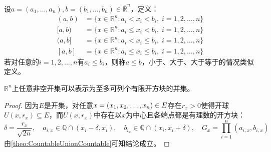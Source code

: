 \begin{definition}
	设$a=(a_1,\dots,a_n),b=(b_1,\dots,b_n)\in\overline{\mathbb{R}}^n$，定义：
	\begin{align*}
		(a,b)&=\{x\in\mathbb{R}^{n}:a_i<x_i<b_i,\;i=1,2,\dots,n\} \\
		[a,b)&=\{x\in\mathbb{R}^{n}:a_i\leqslant x_i<b_i,\;i=1,2,\dots,n\} \\
		(a,b]&=\{x\in\mathbb{R}^{n}:a_i<x_i\leqslant b_i,\;i=1,2,\dots,n\} \\
		[a,b]&=\{x\in\mathbb{R}^{n}:a_i\leqslant x_i\leqslant b_i,\;i=1,2,\dots,n\}
	\end{align*}
	若对任意的$i=1,2,\dots,n$有$a_i\leqslant b_i$，则称$a\leqslant b$，小于、大于、大于等于的情况类似定义。
\end{definition}
\begin{lemma}\label{lem:OpenCountableCubes}
	$\mathbb{R}^{n}$上任意非空开集可以表示为至多可列个有限开方块的并集。
\end{lemma}
\begin{proof}
	因为$E$是开集，对任意$x=(x_1, x_2, \dots, x_{n})\in E$存在$r_x>0$使得开球$U(x,r_x)\subseteq E$，而$U(x,r_x)$中存在以$x$为中心且各端点都是有理数的开方块：
	\begin{equation*}
		\delta=\frac{r_x}{\sqrt{2n}},\quad a_{i,x}\in\mathbb{Q}\cap(x_i-\delta,x_i),\quad b_{i_x}\in\mathbb{Q}\cap(x_i,x_i+\delta),\quad G_x=\prod_{i=1}^{n}(a_{i,x},b_{i,x})
	\end{equation*}
	由\cref{theo:CountableUnionCountable}可知结论成立。
\end{proof}
